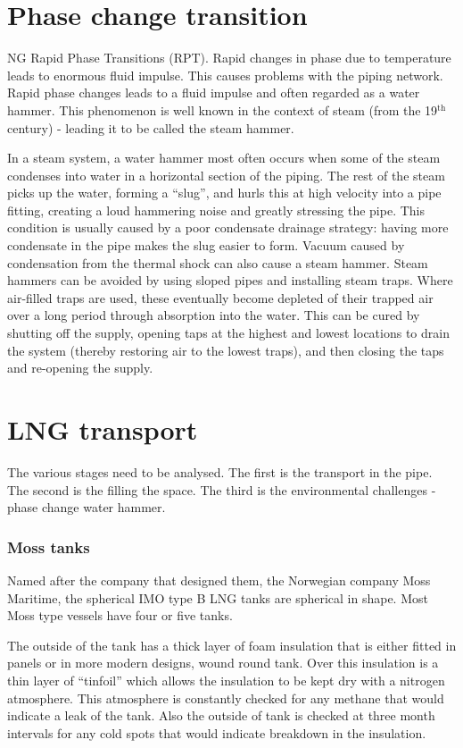 \section{Phase change transition}
NG Rapid Phase Transitions (RPT). Rapid changes in phase due to temperature leads to enormous fluid impulse. This causes problems with the piping network. Rapid phase changes leads to a fluid impulse and often regarded as a water hammer. This phenomenon is well known in the context of steam (from the 19$^{\textrm{th}}$ century) - leading it to be called the steam hammer.

In a steam system, a water hammer most often occurs when some of the steam condenses into water in a horizontal section of the piping. The rest of the steam picks up the water, forming a ``slug'', and hurls this at high velocity into a pipe fitting, creating a loud hammering noise and greatly stressing the pipe. This condition is usually caused by a poor condensate drainage strategy: having more condensate in the pipe makes the slug easier to form. Vacuum caused by condensation from the thermal shock can also cause a steam hammer. Steam hammers can be avoided by using sloped pipes and installing steam traps. Where air-filled traps are used, these eventually become depleted of their trapped air over a long period through absorption into the water. This can be  cured by shutting off the supply, opening taps at the highest and lowest locations to drain the system (thereby restoring air to the lowest traps), and then closing the taps and re-opening the supply.
\section{LNG transport}
The various stages need to be analysed. The first is the transport in the pipe. The second is the filling the space. The third is the environmental challenges - phase change water hammer.
\subsubsection{Moss tanks}
Named after the company that designed them, the Norwegian company Moss Maritime, the spherical IMO type B LNG tanks are spherical in shape. Most Moss type vessels have four or five tanks.

The outside of the tank has a thick layer of foam insulation that is either fitted in panels or in more modern designs, wound round tank. Over this insulation is a thin layer of ``tinfoil'' which allows the insulation to be kept dry with a nitrogen atmosphere. This atmosphere is constantly checked for any methane that would indicate a leak of the tank. Also the outside of tank is checked at three month intervals for any cold spots that would indicate breakdown in the insulation.

